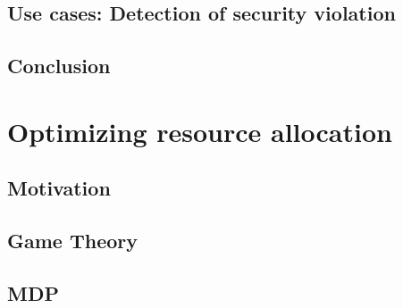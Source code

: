 \documentclass[a4paper, 11pt]{article}
\begin{document}
\subsection{Use cases: Detection of security violation}


\newpage
\subsection{Conclusion}


\newpage
\section{Optimizing resource allocation}
\subsection{Motivation}




\newpage
\subsection{Game Theory}


\newpage
\subsection{MDP}


\newpage


\newpage
{}


\newpage
\begin{appendices}

\newpage

\end{appendices}
\end{document}
